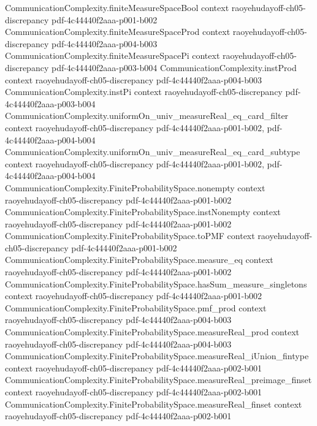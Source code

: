 \begin{lemma}
\proofstep
  {CommunicationComplexity.finiteMeasureSpaceBool}
  {context}
  {raoyehudayoff-ch05-discrepancy}
  {pdf-4c44440f2aaa-p001-b002}
\proofstep
  {CommunicationComplexity.finiteMeasureSpaceProd}
  {context}
  {raoyehudayoff-ch05-discrepancy}
  {pdf-4c44440f2aaa-p004-b003}
\proofstep
  {CommunicationComplexity.finiteMeasureSpacePi}
  {context}
  {raoyehudayoff-ch05-discrepancy}
  {pdf-4c44440f2aaa-p003-b004}
\proofstep
  {CommunicationComplexity.instProd}
  {context}
  {raoyehudayoff-ch05-discrepancy}
  {pdf-4c44440f2aaa-p004-b003}
\proofstep
  {CommunicationComplexity.instPi}
  {context}
  {raoyehudayoff-ch05-discrepancy}
  {pdf-4c44440f2aaa-p003-b004}
\proofstep
  {CommunicationComplexity.uniformOn_univ_measureReal_eq_card_filter}
  {context}
  {raoyehudayoff-ch05-discrepancy}
  {pdf-4c44440f2aaa-p001-b002,
    pdf-4c44440f2aaa-p004-b004}
\proofstep
  {CommunicationComplexity.uniformOn_univ_measureReal_eq_card_subtype}
  {context}
  {raoyehudayoff-ch05-discrepancy}
  {pdf-4c44440f2aaa-p001-b002,
    pdf-4c44440f2aaa-p004-b004}
\proofstep
  {CommunicationComplexity.FiniteProbabilitySpace.nonempty}
  {context}
  {raoyehudayoff-ch05-discrepancy}
  {pdf-4c44440f2aaa-p001-b002}
\proofstep
  {CommunicationComplexity.FiniteProbabilitySpace.instNonempty}
  {context}
  {raoyehudayoff-ch05-discrepancy}
  {pdf-4c44440f2aaa-p001-b002}
\proofstep
  {CommunicationComplexity.FiniteProbabilitySpace.toPMF}
  {context}
  {raoyehudayoff-ch05-discrepancy}
  {pdf-4c44440f2aaa-p001-b002}
\proofstep
  {CommunicationComplexity.FiniteProbabilitySpace.measure_eq}
  {context}
  {raoyehudayoff-ch05-discrepancy}
  {pdf-4c44440f2aaa-p001-b002}
\proofstep
  {CommunicationComplexity.FiniteProbabilitySpace.hasSum_measure_singletons}
  {context}
  {raoyehudayoff-ch05-discrepancy}
  {pdf-4c44440f2aaa-p001-b002}
\proofstep
  {CommunicationComplexity.FiniteProbabilitySpace.pmf_prod}
  {context}
  {raoyehudayoff-ch05-discrepancy}
  {pdf-4c44440f2aaa-p004-b003}
\proofstep
  {CommunicationComplexity.FiniteProbabilitySpace.measureReal_prod}
  {context}
  {raoyehudayoff-ch05-discrepancy}
  {pdf-4c44440f2aaa-p004-b003}
\proofstep
  {CommunicationComplexity.FiniteProbabilitySpace.measureReal_iUnion_fintype}
  {context}
  {raoyehudayoff-ch05-discrepancy}
  {pdf-4c44440f2aaa-p002-b001}
\proofstep
  {CommunicationComplexity.FiniteProbabilitySpace.measureReal_preimage_finset}
  {context}
  {raoyehudayoff-ch05-discrepancy}
  {pdf-4c44440f2aaa-p002-b001}
\proofstep
  {CommunicationComplexity.FiniteProbabilitySpace.measureReal_finset}
  {context}
  {raoyehudayoff-ch05-discrepancy}
  {pdf-4c44440f2aaa-p002-b001}

\end{lemma}
